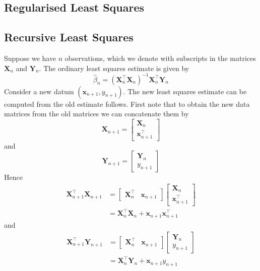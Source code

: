 \documentclass[11pt]{report} %
\begin{document}
\subsection{Regularised Least Squares}

\subsection{Recursive Least Squares}

Suppose we have $n$ observations, which we denote with subscripts in the matrices $\mathbf{X}_{n}$ and $\mathbf{Y}_{n}$. The ordinary least squares estimate is given by
\begin{equation}
\hat{\beta}_{n} = \left(\mathbf{X}_{n}^{\top}\mathbf{X}_{n}\right)^{-1}\mathbf{X}_{n}^{\top}\mathbf{Y}_{n}
\end{equation}
Consider a new datum $\left(\mathbf{x}_{n + 1}, y_{n + 1}\right)$. The new least squares estimate can be computed from the old estimate follows. First note that to obtain the new data matrices from the old matrices we can concatenate them by
\begin{equation}
\mathbf{X}_{n + 1} = \begin{bmatrix}
\mathbf{X}_{n} \\ \mathbf{x}_{n + 1}^{\top}
\end{bmatrix}
\end{equation}
and
\begin{equation}
\mathbf{Y}_{n + 1} = \begin{bmatrix}
\mathbf{Y}_{n} \\ y_{n + 1}
\end{bmatrix}
\end{equation}
Hence
\begin{align}
\mathbf{X}_{n + 1}^{\top}\mathbf{X}_{n + 1} &= \begin{bmatrix}
\mathbf{X}_{n}^{\top} & \mathbf{x}_{n + 1}
\end{bmatrix}\begin{bmatrix}
\mathbf{X}_{n} \\ \mathbf{x}_{n + 1}^{\top}
\end{bmatrix} \\
&= \mathbf{X}_{n}^{\top}\mathbf{X}_{n} + \mathbf{x}_{n + 1}\mathbf{x}_{n + 1}^{\top}
\end{align}
and
\begin{align}
\mathbf{X}_{n + 1}^{\top}\mathbf{Y}_{n + 1} &= \begin{bmatrix}
\mathbf{X}_{n}^{\top} & \mathbf{x}_{n + 1}
\end{bmatrix}\begin{bmatrix}
\mathbf{Y}_{n} \\ y_{n + 1}
\end{bmatrix} \\
&= \mathbf{X}_{n}^{\top}\mathbf{Y}_{n} + \mathbf{x}_{n + 1}y_{n + 1}
\end{align}
\end{document}

